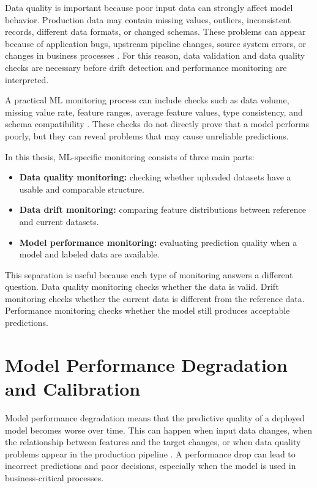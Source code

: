 Data quality is important because poor input data can strongly affect model behavior. Production data may contain missing values, outliers, inconsistent records, different data formats, or changed schemas. These problems can appear because of application bugs, upstream pipeline changes, source system errors, or changes in business processes \cite{MonitoringPerformance}. For this reason, data validation and data quality checks are necessary before drift detection and performance monitoring are interpreted.

A practical ML monitoring process can include checks such as data volume, missing value rate, feature ranges, average feature values, type consistency, and schema compatibility \cite{MonitoringPerformance}. These checks do not directly prove that a model performs poorly, but they can reveal problems that may cause unreliable predictions.

In this thesis, ML-specific monitoring consists of three main parts:

\begin{itemize}
    \item \textbf{Data quality monitoring:} checking whether uploaded datasets have a usable and comparable structure.
    \item \textbf{Data drift monitoring:} comparing feature distributions between reference and current datasets.
    \item \textbf{Model performance monitoring:} evaluating prediction quality when a model and labeled data are available.
\end{itemize}

This separation is useful because each type of monitoring answers a different question. Data quality monitoring checks whether the data is valid. Drift monitoring checks whether the current data is different from the reference data. Performance monitoring checks whether the model still produces acceptable predictions.

\section{Model Performance Degradation and Calibration}

Model performance degradation means that the predictive quality of a deployed model becomes worse over time. This can happen when input data changes, when the relationship between features and the target changes, or when data quality problems appear in the production pipeline \cite{MonitoringPerformance}. A performance drop can lead to incorrect predictions and poor decisions, especially when the model is used in business-critical processes.

